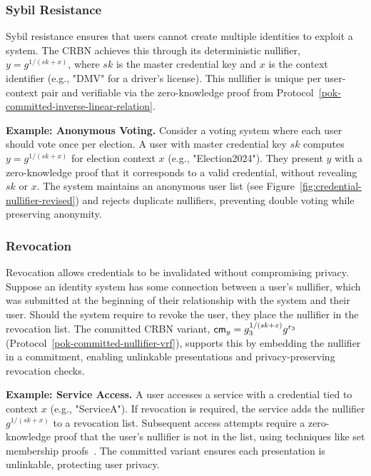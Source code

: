 \subsubsection{Sybil Resistance}\label{subsubsec:sybil-resistance}
Sybil resistance ensures that users cannot create multiple identities to exploit a system. The CRBN achieves this through its deterministic nullifier, $y = g^{1/(sk + x)}$, where $sk$ is the master credential key and $x$ is the context identifier (e.g., "DMV" for a driver's license). This nullifier is unique per user-context pair and verifiable via the zero-knowledge proof from Protocol~\ref{pok-committed-inverse-linear-relation}.

\textbf{Example: Anonymous Voting.} Consider a voting system where each user should vote once per election. A user with master credential key $sk$ computes $y = g^{1/(sk + x)}$ for election context $x$ (e.g., "Election2024"). They present $y$ with a zero-knowledge proof that it corresponds to a valid credential, without revealing $sk$ or $x$. The system maintains an anonymous user list (see Figure~\ref{fig:credential-nullifier-revised}) and rejects duplicate nullifiers, preventing double voting while preserving anonymity.

\subsubsection{Revocation}\label{subsubsec:revocation}
Revocation allows credentials to be invalidated without compromising privacy. Suppose an identity system has some connection between a user's nullifier, which was submitted at the beginning of their relationship with the system and their user. Should the system require to revoke the user, they place the nullifier in the revocation list. The committed CRBN variant, $\mathsf{cm}_y = g_3^{1/(sk + x)} g^{r_3}$ (Protocol~\ref{pok-committed-nullifier-vrf}), supports this by embedding the nullifier in a commitment, enabling unlinkable presentations and privacy-preserving revocation checks.

\textbf{Example: Service Access.} A user accesses a service with a credential tied to context $x$ (e.g., "ServiceA"). If revocation is required, the service adds the nullifier $g^{1/(sk + x)}$ to a revocation list. Subsequent access attempts require a zero-knowledge proof that the user’s nullifier is not in the list, using techniques like set membership proofs~\cite{goos_dynamic_2002}. The committed variant ensures each presentation is unlinkable, protecting user privacy.

